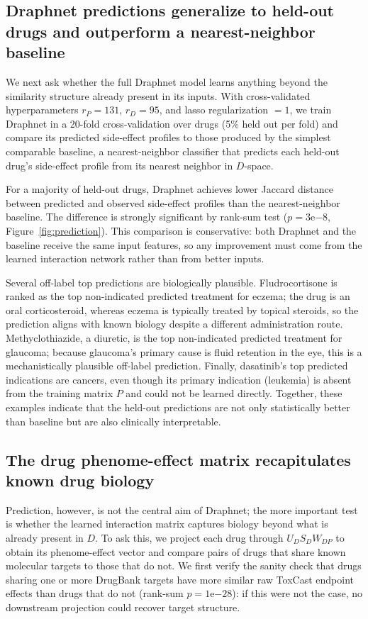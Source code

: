 \documentclass[11pt]{article}
\begin{document}
\subsection{Draphnet predictions generalize to held-out drugs and
outperform a nearest-neighbor baseline}

We next ask whether the full Draphnet model learns anything beyond the
similarity structure already present in its inputs. With
cross-validated hyperparameters $r_P = 131$, $r_D = 95$, and lasso
regularization $=1$, we train Draphnet in a 20-fold cross-validation
over drugs (5\% held out per fold) and compare its predicted side-effect
profiles to those produced by the simplest comparable baseline, a
nearest-neighbor classifier that predicts each held-out drug's
side-effect profile from its nearest neighbor in $D$-space.

For a majority of held-out drugs, Draphnet achieves lower Jaccard
distance between predicted and observed side-effect profiles than the
nearest-neighbor baseline. The difference is strongly significant by
rank-sum test ($p=3\mathrm{e}{-8}$, Figure~\ref{fig:prediction}). This
comparison is conservative: both Draphnet and the baseline receive the
same input features, so any improvement must come from the learned
interaction network rather than from better inputs.

Several off-label top predictions are biologically plausible.
Fludrocortisone is ranked as the top non-indicated predicted treatment
for eczema; the drug is an oral corticosteroid, whereas eczema is
typically treated by topical steroids, so the prediction aligns with
known biology despite a different administration route. Methyclothiazide,
a diuretic, is the top non-indicated predicted treatment for glaucoma;
because glaucoma's primary cause is fluid retention in the eye, this is
a mechanistically plausible off-label prediction. Finally, dasatinib's
top predicted indications are cancers, even though its primary indication
(leukemia) is absent from the training matrix $P$ and could not be
learned directly. Together, these examples indicate that the held-out
predictions are not only statistically better than baseline but are
also clinically interpretable.

\subsection{The drug phenome-effect matrix recapitulates known drug
biology}

Prediction, however, is not the central aim of Draphnet; the more
important test is whether the learned interaction matrix captures
biology beyond what is already present in $D$. To ask this, we project
each drug through $U_D S_D W_{DP}$ to obtain its phenome-effect vector
and compare pairs of drugs that share known molecular targets to those
that do not. We first verify the sanity check that drugs sharing one or
more DrugBank targets have more similar raw ToxCast endpoint effects
than drugs that do not (rank-sum $p=1\mathrm{e}{-28}$): if this were
not the case, no downstream projection could recover target structure.
\end{document}
